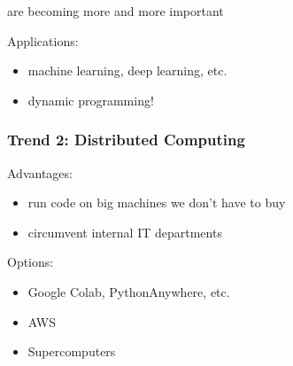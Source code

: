\begin{frame}

     are becoming more and more important


    \begin{figure}
       \begin{center}
       \end{center}
    \end{figure}

    \vspace{0.5em}

    Applications: 
    \begin{itemize}
        \item machine learning, deep learning, etc.
        \item dynamic programming!
    \end{itemize}
    

\end{frame}



\begin{frame}
    \frametitle{Trend 2: Distributed Computing}
    
    Advantages: 
    \begin{itemize}
        \item run code on big machines we don't have to buy
        \vspace{0.5em}
        \item circumvent internal IT departments
    \end{itemize}

    \vspace{0.5em}

    Options:
    \begin{itemize}
        \item Google Colab, PythonAnywhere, etc.
            \vspace{0.5em}
        \item AWS 
            \vspace{0.5em}
        \item Supercomputers
    \end{itemize}

\end{frame}






